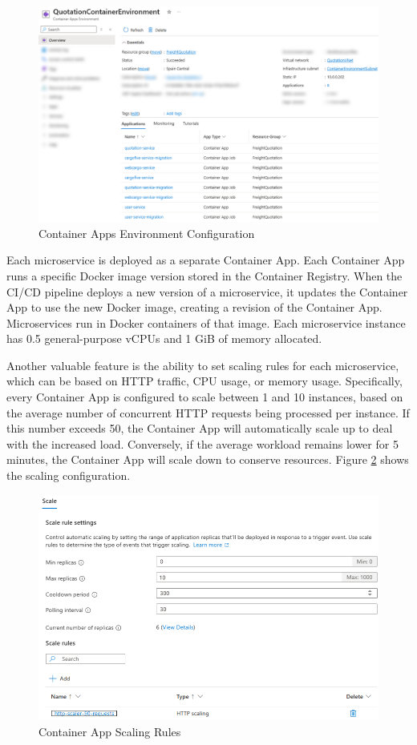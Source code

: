 \documentclass[12pt, reqno]{amsbook}
\theoremstyle{definition}
\theoremstyle{definition}
\numberwithin{section}{chapter}
\numberwithin{table}{chapter}
\numberwithin{figure}{chapter}
\begin{document}
\begin{figure}[H]
  \centering
  \includegraphics[width=1\linewidth]{images/ContainerAppsEnvironment.png}
  \caption{\label{Figure:ContainerAppsEnvironment}Container Apps Environment Configuration}
\end{figure}

Each microservice is deployed as a separate Container App. Each Container App runs a specific Docker image version stored in the Container Registry. When the \ac{CI/CD} pipeline deploys a new version of a microservice, it updates the Container App to use the new Docker image, creating a revision of the Container App. Microservices run in Docker containers of that image. Each microservice instance has 0.5 general-purpose \acp{vCPU} and 1 \ac{GiB} of memory allocated.

Another valuable feature is the ability to set scaling rules for each microservice, which can be based on \ac{HTTP} traffic, \ac{CPU} usage, or memory usage. Specifically, every Container App is configured to scale between 1 and 10 instances, based on the average number of concurrent \ac{HTTP} requests being processed per instance. If this number exceeds 50, the Container App will automatically scale up to deal with the increased load. Conversely, if the average workload remains lower for 5 minutes, the Container App will scale down to conserve resources. Figure \ref{Figure:ContainerAppsScaling} shows the scaling configuration.

\begin{figure}[H]
  \centering
  \includegraphics[width=0.9\linewidth]{images/ContainerAppsScaling.png}
  \caption{\label{Figure:ContainerAppsScaling}Container App Scaling Rules}
\end{figure}
\end{document}
